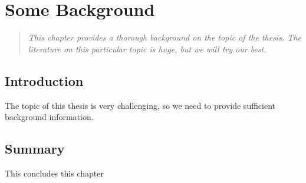 \chapter{Some Background}\label{Background_1_chapter}
\begin{quote}
{\it This chapter provides a thorough background on the topic of the thesis. The literature on this particular topic is huge, but we will try our best.}
\end{quote}

\section{Introduction}\label{Intro_2}
The topic of this thesis is very challenging, so we need to provide sufficient background information.

\section{Summary}
This concludes this chapter
